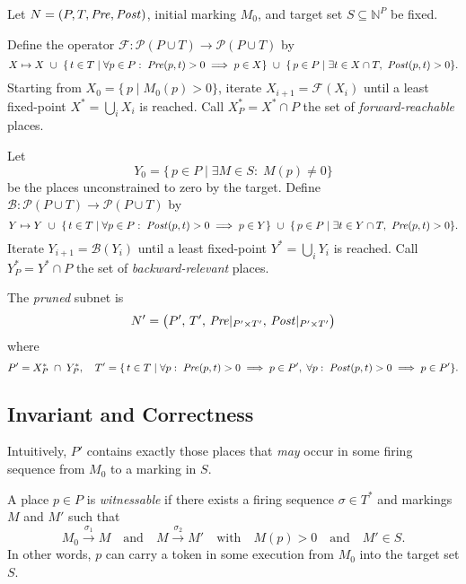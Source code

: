 Let $N=(P,T,\mathit{Pre},\mathit{Post})$, initial marking $M_0$, and target set
$S\subseteq\mathbb{N}^P$ be fixed.

\begin{definition}
	Define the operator $\mathcal{F}:\mathcal{P}(P\cup T)\to\mathcal{P}(P\cup T)$ by
	\[
	X \mapsto X
	~\cup~
	\{\,t\in T \mid \forall p\in P:\; \mathit{Pre}(p,t)>0 \implies p\in X\}
	~\cup~
	\{\,p\in P \mid \exists t\in X\cap T,\ \mathit{Post}(p,t)>0\}.
	\]
	Starting from $X_0 = \{\,p\mid M_0(p)>0\}$, iterate
	$X_{i+1} = \mathcal{F}(X_i)$ until a least fixed-point
	$X^*=\bigcup_i X_i$ is reached.  Call $X^*_P = X^*\cap P$ the set of
	\emph{forward-reachable} places.
\end{definition}

\begin{definition}
	Let
	\[
	Y_0 = \{\,p\in P \mid \exists M\in S:\;M(p)\neq0\}
	\]
	be the places unconstrained to zero by the target.  Define
	$\mathcal{B}:\mathcal{P}(P\cup T)\to\mathcal{P}(P\cup T)$ by
	\[
	Y \mapsto Y
	~\cup~
	\{\,t\in T \mid \forall p\in P:\; \mathit{Post}(p,t)>0 \implies p\in Y\}
	~\cup~
	\{\,p\in P \mid \exists t\in Y\cap T,\ \mathit{Pre}(p,t)>0\}.
	\]
	Iterate $Y_{i+1} = \mathcal{B}(Y_i)$ until a least fixed-point
	$Y^*=\bigcup_i Y_i$ is reached.  Call $Y^*_P = Y^*\cap P$ the set of
	\emph{backward-relevant} places.
\end{definition}

\begin{definition}
	The \emph{pruned} subnet is
	\[
	N' = \bigl(P',\,T',\,\mathit{Pre}|_{P'\times T'},\,\mathit{Post}|_{P'\times T'}\bigr)
	\]
	where
	\[
	P' = X^*_P \;\cap\; Y^*_P,
	\quad
	T' = \{\,t\in T \mid
	\forall p:\;\mathit{Pre}(p,t)>0\implies p\in P',\;
	\forall p:\;\mathit{Post}(p,t)>0\implies p\in P'
	\}.
	\]
\end{definition}

\subsection{Invariant and Correctness}

Intuitively, $P'$ contains exactly those places that
\emph{may} occur in some firing sequence from $M_0$ to a marking in $S$.

\begin{definition}
	A place $p\in P$ is \emph{witnessable} if there exists a firing
	sequence $\sigma\in T^*$ and markings $M$ and $M'$ such that
	\[
	M_0 \xrightarrow{\sigma_1} M
	\quad\text{and}\quad
	M \xrightarrow{\sigma_2} M'
	\quad\text{with}\quad
	M(p)>0
	\quad\text{and}\quad
	M'\in S.
	\]
	In other words, $p$ can carry a token in some execution from $M_0$ into the target set $S$.
\end{definition}

